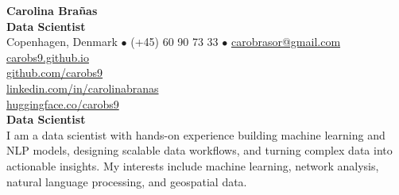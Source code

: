 \documentclass{resume}
\begin{document}
\vspace{-2em}
\begin{minipage}{0.75\textwidth}
    \raggedright
    {\Huge \textbf{Carolina Brañas}}\\[0.4em]
    {\normalsize \textbf{Data Scientist}}\\[0.8em]
    {\small
    Copenhagen, Denmark $\bullet$
    (+45) 60 90 73 33 $\bullet$
    \href{mailto:carobrasor@gmail.com}{carobrasor@gmail.com} \\[0.25em]
    \href{https://carobs9.github.io/}{carobs9.github.io} \\[0.25em]
    \href{https://github.com/carobs9}{github.com/carobs9} \\[0.25em]
    \href{https://www.linkedin.com/in/carolinabranas/}{linkedin.com/in/carolinabranas} \\[0.25em]
    \href{https://huggingface.co/carobs9}{huggingface.co/carobs9}
    }\\[1em]
    {\normalsize \textbf{Data Scientist}}\\[0.5em]
    I am a data scientist with hands-on experience building machine learning and NLP models, designing scalable data workflows, and turning complex data into actionable insights. 
    My interests include machine learning, network analysis, natural language processing, and geospatial data. \\
\end{minipage}
\hfill
\vspace{1em}

\end{document}
